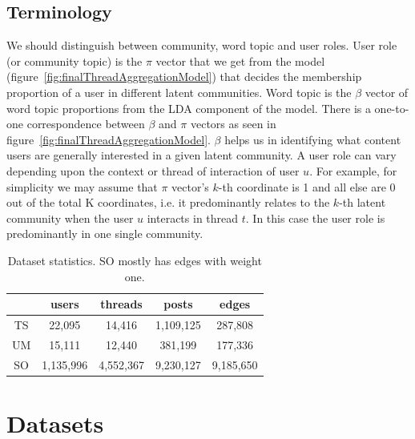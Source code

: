 \documentclass{sig-alternate}
\begin{document}
\subsection{Terminology} 
\label{sec:term}
We should distinguish between 
community, word topic and user roles. User role (or community topic) is the 
$\pi$ vector that we get from
the model (figure~\ref{fig:finalThreadAggregationModel}) that decides the 
membership proportion of a user in
different latent communities. Word topic is the $\beta$ vector of word topic
proportions from the LDA component of the model. There is a one-to-one
correspondence between $\beta$ and $\pi$ vectors as seen in
figure~\ref{fig:finalThreadAggregationModel}. $\beta$ helps us in identifying
what content users are generally interested in a given latent community.
A user role can vary depending upon the 
context or thread of interaction of user $u$.
For example, for simplicity we may assume that $\pi$ vector's 
$k$-th coordinate is 1
and all else are 0 out of the total K coordinates, i.e. it predominantly relates
to the $k$-th latent community when the user $u$ interacts in thread $t$.
In this case the user role is predominantly in one single community.


\begin{table}
\begin{center}
\begin{tabular}{c|c|c|c|c|}
 & users & threads & posts & edges\\\hline
 TS & 22,095 & 14,416 & 1,109,125 & 287,808\\\hline
 UM & 15,111 & 12,440 & 381,199 & 177,336\\\hline
 SO & 1,135,996 & 4,552,367 & 9,230,127 & 9,185,650\\\hline
\end{tabular}
\label{tab:dataStats}
\end{center}
\vspace*{-1\baselineskip}
\caption{Dataset statistics. SO mostly has edges with weight one.}
\vspace*{-1\baselineskip}
\end{table}




\section{Datasets}
\label{sec:dataset}
\end{document}
